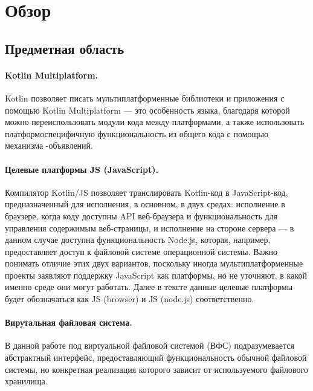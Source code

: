 \section{Обзор}\label{overview}

\subsection{Предметная область}

  \paragraph{Kotlin Multiplatform.} Kotlin позволяет писать мультиплатформенные библиотеки и приложения с помощью Kotlin Multiplatform\cite{kotlin-multiplatform} --- это особенность языка, благодаря которой можно переиспользовать модули кода между платформами, а также использовать платформоспецифичную функциональность из общего кода с помощью механизма -объявлений.

  \paragraph{Целевые платформы JS (JavaScript).} Компилятор Kotlin/JS\cite{kotlin-js} позволяет транслировать Kotlin-код в JavaScript-код, предназначенный для исполнения, в основном, в двух средах: исполнение в браузере, когда коду доступны API веб-браузера и функциональность для управления содержимым веб-страницы, и исполнение на стороне сервера --- в данном случае доступна функциональность Node.js, которая, например, предоставляет доступ к файловой системе операционной системы\cite{nodejs-browser-diff}. Важно понимать отличие этих двух вариантов, поскольку иногда мультиплатформенные проекты заявляют поддержку JavaScript как платформы, но не уточняют, в какой именно среде они могут работать. Далее в тексте данные целевые платформы будет обозначаться как JS (browser) и JS (node.js) соответственно.

  \paragraph{Вирутальная файловая система.} В данной работе под виртуальной файловой системой\cite{wiki-vfs} (ВФС) подразумевается абстрактный интерфейс, предоставляющий функциональность обычной файловой системы, но конкретная реализация которого зависит от используемого файлового хранилища.

